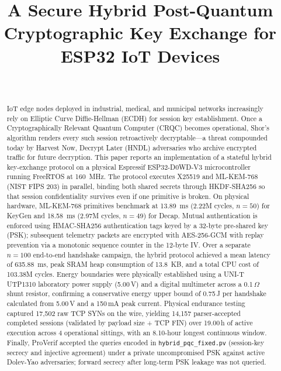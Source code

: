 \documentclass[journal, 10pt]{IEEEtran}
\begin{document}
\title{A Secure Hybrid Post-Quantum Cryptographic Key Exchange for ESP32 IoT Devices}

\author{
     \\
}

\maketitle

\begin{abstract}
IoT edge nodes deployed in industrial, medical, and municipal networks increasingly rely on Elliptic Curve Diffie-Hellman (ECDH) for session key establishment. Once a Cryptographically Relevant Quantum Computer (CRQC) becomes operational, Shor's algorithm renders every such session retroactively decryptable---a threat compounded today by Harvest Now, Decrypt Later (HNDL) adversaries who archive encrypted traffic for future decryption. This paper reports an implementation of a stateful hybrid key-exchange protocol on a physical Espressif ESP32-D0WD-V3 microcontroller running FreeRTOS at 160~MHz. The protocol executes X25519 and ML-KEM-768 (NIST FIPS 203) in parallel, binding both shared secrets through HKDF-SHA256 so that session confidentiality survives even if one primitive is broken. On physical hardware, ML-KEM-768 primitives benchmark at 13.89~ms (2.22M cycles, $n=50$) for KeyGen and 18.58~ms (2.97M cycles, $n=49$) for Decap. Mutual authentication is enforced using HMAC-SHA256 authentication tags keyed by a 32-byte pre-shared key (PSK); subsequent telemetry packets are encrypted with AES-256-GCM with replay prevention via a monotonic sequence counter in the 12-byte IV. Over a separate $n=100$ end-to-end handshake campaign, the hybrid protocol achieved a mean latency of 635.88~ms, peak SRAM heap consumption of 13.8~KB, and a total CPU cost of 103.38M cycles. Energy boundaries were physically established using a UNI-T UTP1310 laboratory power supply (5.00\,V) and a digital multimeter across a 0.1\,$\Omega$ shunt resistor, confirming a conservative energy upper bound of 0.75\,J per handshake calculated from 5.00\,V and a 150\,mA peak current. Physical endurance testing captured 17,502 raw TCP SYNs on the wire, yielding 14,157 parser-accepted completed sessions (validated by payload size + TCP FIN) over 19.00\,h of active execution across 4 operational sittings, with an 8.10-hour longest continuous window. Finally, ProVerif accepted the queries encoded in \texttt{hybrid\_pqc\_fixed.pv} (session-key secrecy and injective agreement) under a private uncompromised PSK against active Dolev-Yao adversaries; forward secrecy after long-term PSK leakage was not queried.
\end{abstract}
\end{document}
